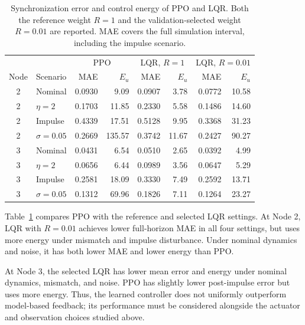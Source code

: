 \documentclass[a4paper,fleqn]{cas-dc}
\theoremstyle{plain}
\theoremstyle{definition}
\begin{document}
\begin{table}[pos=!t,width=\textwidth]
\centering
\normalsize
\setlength{\tabcolsep}{6pt}
\renewcommand{\arraystretch}{1.15}
\caption{Synchronization error and control energy of PPO and LQR. Both the reference weight $R=1$ and the validation-selected weight $R=0.01$ are reported. MAE covers the full simulation interval, including the impulse scenario.}
\label{tab:lqr_weight_sensitivity}
\begin{tabular}{@{}clrrrrrr@{}}
\toprule
 & & \multicolumn{2}{c}{PPO} & \multicolumn{2}{c}{LQR, $R=1$} & \multicolumn{2}{c}{LQR, $R=0.01$} \\
Node & Scenario & MAE & $E_u$ & MAE & $E_u$ & MAE & $E_u$ \\
\midrule
2 & Nominal & 0.0930 & 9.09 & 0.0907 & 3.78 & 0.0772 & 10.58 \\
2 & $\eta=2$ & 0.1703 & 11.85 & 0.2330 & 5.58 & 0.1486 & 14.60 \\
2 & Impulse & 0.4339 & 17.51 & 0.5128 & 9.95 & 0.3368 & 31.23 \\
2 & $\sigma=0.05$ & 0.2669 & 135.57 & 0.3742 & 11.67 & 0.2427 & 90.27 \\
\midrule
3 & Nominal & 0.0431 & 6.54 & 0.0510 & 2.65 & 0.0392 & 4.99 \\
3 & $\eta=2$ & 0.0656 & 6.44 & 0.0989 & 3.56 & 0.0647 & 5.29 \\
3 & Impulse & 0.2581 & 18.09 & 0.3330 & 7.49 & 0.2592 & 13.71 \\
3 & $\sigma=0.05$ & 0.1312 & 69.96 & 0.1826 & 7.11 & 0.1264 & 23.27 \\
\bottomrule
\end{tabular}
\end{table}

Table~\ref{tab:lqr_weight_sensitivity} compares PPO with the reference and selected LQR settings. At Node 2, LQR with $R=0.01$ achieves lower full-horizon MAE in all four settings, but uses more energy under mismatch and impulse disturbance. Under nominal dynamics and noise, it has both lower MAE and lower energy than PPO.

At Node 3, the selected LQR has lower mean error and energy under nominal dynamics, mismatch, and noise. PPO has slightly lower post-impulse error but uses more energy. Thus, the learned controller does not uniformly outperform model-based feedback; its performance must be considered alongside the actuator and observation choices studied above.
\end{document}
